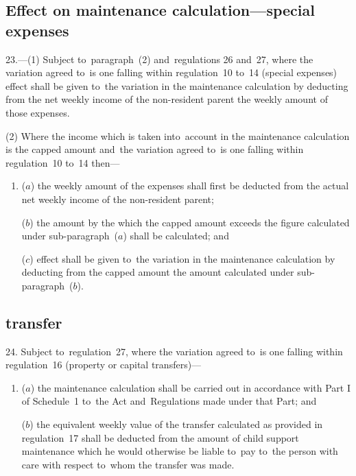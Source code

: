 \documentclass[12pt,a4paper]{article}
\begin{document}
\subsection[23. Effect on maintenance calculation—special expenses]{Effect on maintenance calculation—special expenses}

23.---(1)  Subject to~paragraph~(2) and~regulations 26 and~27, where the variation agreed to~is one falling within regulation~10 to~14 (special expenses) effect shall be given to~the variation in the maintenance calculation by deducting from the net weekly income of the non-resident parent the weekly amount of those expenses.

(2) Where the income which is taken into~account in the maintenance calculation is the capped amount and~the variation agreed to~is one falling within regulation~10 to~14 then—
\begin{enumerate}\item[]
($a$) the weekly amount of the expenses shall first be deducted from the actual net weekly income of the non-resident parent;

($b$) the amount by the which the capped amount exceeds the figure calculated under sub-paragraph~($a$)  shall be calculated; and

($c$) effect shall be given to~the variation in the maintenance calculation by deducting from the capped amount the amount calculated under sub-paragraph~($b$).
\end{enumerate}

\subsection[24. Effect on maintenance calculation—property or capital transfer]{\sloppy {} transfer}

24.  Subject to~regulation~27, where the variation agreed to~is one falling within regulation~16 (property or capital transfers)—
\begin{enumerate}\item[]
($a$) the maintenance calculation shall be carried out in accordance with Part I of Schedule~1 to~the Act and~Regulations made under that Part; and

($b$) the equivalent weekly value of the transfer calculated as provided in regulation~17 shall be deducted from the amount of child support maintenance which he would otherwise be liable to~pay to~the person with care with respect to~whom the transfer was made.
\end{enumerate}
\end{document}

